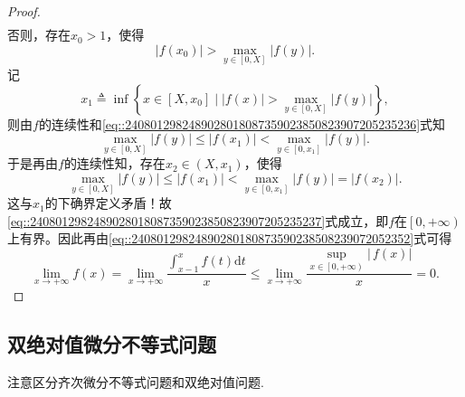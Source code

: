 \documentclass[../../main.tex]{subfiles}
\begin{document}
\begin{proof}
\begin{align}
\end{align}
否则，存在$x_0>1$，使得
\[
\left| f\left( x_0 \right) \right|>\max_{y\in \left[ 0,X \right]} \left| f\left( y \right) \right|.
\]
记
\[
x_1\triangleq \inf\left\{ x\in \left[ X,x_0 \right] \mid \left| f\left( x \right) \right|>\max_{y\in \left[ 0,X \right]} \left| f\left( y \right) \right| \right\},
\]
则由$f$的连续性和\eqref{eq::2408012982489028018087359023850823907205235236}式知
\[
\max_{y\in \left[ 0,X \right]} \left| f\left( y \right) \right|\leqslant \left| f\left( x_1 \right) \right|<\max_{y\in \left[ 0,x_1 \right]} \left| f\left( y \right) \right|.
\]
于是再由$f$的连续性知，存在$x_2\in \left( X,x_1 \right)$，使得
\[
\max_{y\in \left[ 0,X \right]} \left| f\left( y \right) \right|\leqslant \left| f\left( x_1 \right) \right|<\max_{y\in \left[ 0,x_1 \right]} \left| f\left( y \right) \right|=\left| f\left( x_2 \right) \right|.
\]
这与$x_1$的下确界定义矛盾！故\eqref{eq::2408012982489028018087359023850823907205235237}式成立，即$f$在$\left[ 0,+\infty \right)$上有界。因此再由\eqref{eq::24080129824890280180873590238508239072052352}式可得
\[
\lim_{x\rightarrow +\infty} f\left( x \right) =\lim_{x\rightarrow +\infty} \frac{\int_{x-1}^x{f\left( t \right) \mathrm{d}t}}{x}\leqslant \lim_{x\rightarrow +\infty} \frac{\sup\limits_{x\in \left[ 0,+\infty \right)} \left| \,f\left( x \right) \right|}{x}=0.
\]

\end{proof}


\subsection{双绝对值微分不等式问题}\label{subsection:双绝对值问题}

注意区分齐次微分不等式问题和双绝对值问题.
\end{document}
